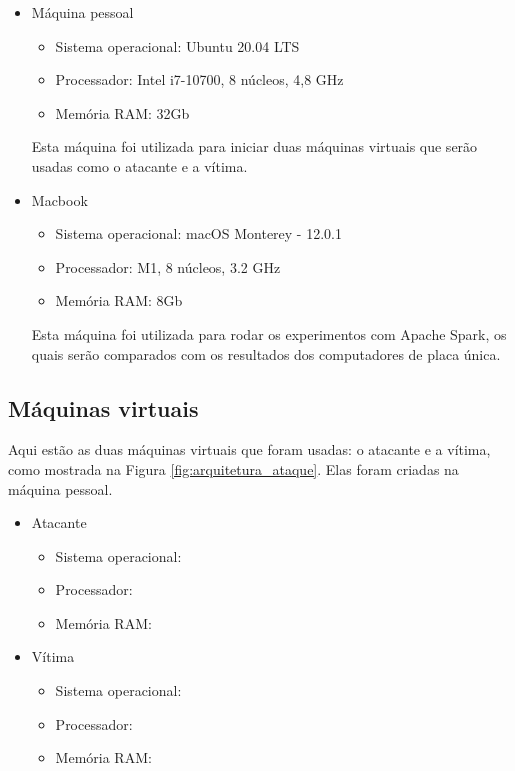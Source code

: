 \begin{itemize}
    \item Máquina pessoal
        \begin{itemize}
            \item Sistema operacional: Ubuntu 20.04 LTS
            \item Processador: Intel i7-10700, 8 núcleos, 4,8 GHz
            \item Memória RAM: 32Gb
        \end{itemize}
        Esta máquina foi utilizada para iniciar duas máquinas virtuais que serão usadas 
        como o atacante e a vítima.
    \item Macbook 
        \begin{itemize}
            \item Sistema operacional: macOS Monterey - 12.0.1
            \item Processador: M1, 8 núcleos, 3.2 GHz
            \item Memória RAM: 8Gb
        \end{itemize}        
        Esta máquina foi utilizada para rodar os experimentos com Apache Spark, os quais 
        serão comparados com os resultados dos computadores de placa única.
\end{itemize}


\subsection{Máquinas virtuais}

Aqui estão as duas máquinas virtuais que foram usadas: o atacante e a vítima, como mostrada na Figura \ref{fig:arquitetura_ataque}. 
Elas foram criadas na máquina pessoal.

\begin{itemize}
    \item Atacante
        \begin{itemize}
            \item Sistema operacional:
            \item Processador: 
            \item Memória RAM: 
        \end{itemize}
    \item Vítima
        \begin{itemize}
            \item Sistema operacional: 
            \item Processador: 
            \item Memória RAM: 
        \end{itemize}        
\end{itemize}



